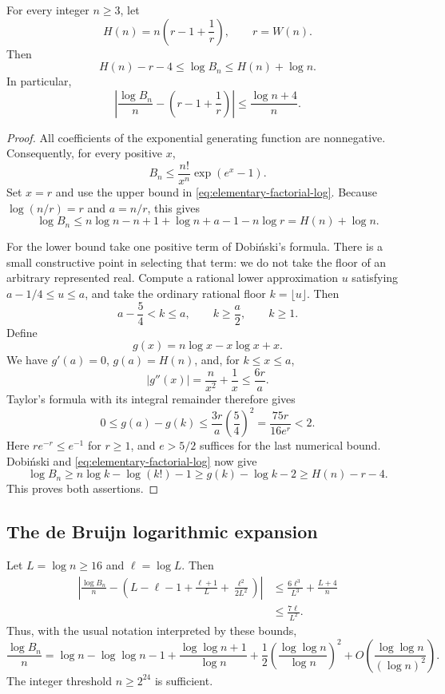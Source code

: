 \begin{theorem}\label{thm:log-envelope}
For every integer $n\geq3$, let
\[
 H(n)=n\left(r-1+\frac1r\right),\qquad r=W(n).
\]
Then
\begin{equation}\label{eq:log-envelope}
 H(n)-r-4\leq\log B_n\leq H(n)+\log n.
\end{equation}
In particular,
\begin{equation}\label{eq:log-envelope-symmetric}
 \left|\frac{\log B_n}{n}-
 \left(r-1+\frac1r\right)\right|
 \leq\frac{\log n+4}{n}.
\end{equation}
\end{theorem}

\begin{proof}
All coefficients of the exponential generating function are
nonnegative.  Consequently, for every positive $x$,
\[
 B_n\leq \frac{n!}{x^n}\exp(e^x-1).
\]
Set $x=r$ and use the upper bound in
\eqref{eq:elementary-factorial-log}.  Because
$\log(n/r)=r$ and $a=n/r$, this gives
\[
 \log B_n\leq n\log n-n+1+\log n+a-1-n\log r
 =H(n)+\log n.
\]

For the lower bound take one positive term of Dobi\'nski's formula.
There is a small constructive point in selecting that term: we do not
take the floor of an arbitrary represented real.  Compute a rational
lower approximation $u$ satisfying $a-1/4\leq u\leq a$, and take the
ordinary rational floor $k=\lfloor u\rfloor$.  Then
\[
 a-\frac54<k\leq a,\qquad k\geq\frac a2,\qquad k\geq1.
\]
Define
\[
 g(x)=n\log x-x\log x+x.
\]
We have $g'(a)=0$, $g(a)=H(n)$, and, for $k\leq x\leq a$,
\[
 |g''(x)|=\frac n{x^2}+\frac1x
 \leq\frac{6r}{a}.
\]
Taylor's formula with its integral remainder therefore gives
\[
 0\leq g(a)-g(k)
 \leq\frac{3r}{a}\left(\frac54\right)^2
 =\frac{75r}{16e^r}<2.
\]
Here $re^{-r}\leq e^{-1}$ for $r\geq1$, and $e>5/2$ suffices for
the last numerical bound.  Dobi\'nski and
\eqref{eq:elementary-factorial-log} now give
\[
 \log B_n\geq n\log k-\log(k!)-1
 \geq g(k)-\log k-2\geq H(n)-r-4.
\]
This proves both assertions.
\end{proof}

\subsection{The de Bruijn logarithmic expansion}

\begin{theorem}
\label{thm:debruijn}
Let $L=\log n\geq16$ and $\ell=\log L$.  Then
\begin{align}
 \left|\frac{\log B_n}{n}
 -\left(L-\ell-1+\frac{\ell+1}{L}
             +\frac{\ell^2}{2L^2}\right)\right|
 &\leq\frac{6\ell^3}{L^3}+\frac{L+4}{n}
 \label{eq:debruijn-sharp-error}\\
 &\leq\frac{7\ell}{L^2}.
 \label{eq:debruijn-displayed-error}
\end{align}
Thus, with the usual notation interpreted by these bounds,
\[
 \frac{\log B_n}{n}
 =\log n-\log\log n-1+
 \frac{\log\log n+1}{\log n}
 +\frac12\left(\frac{\log\log n}{\log n}\right)^2
 +O\!\left(\frac{\log\log n}{(\log n)^2}\right).
\]
The integer threshold $n\geq2^{24}$ is sufficient.
\end{theorem}

